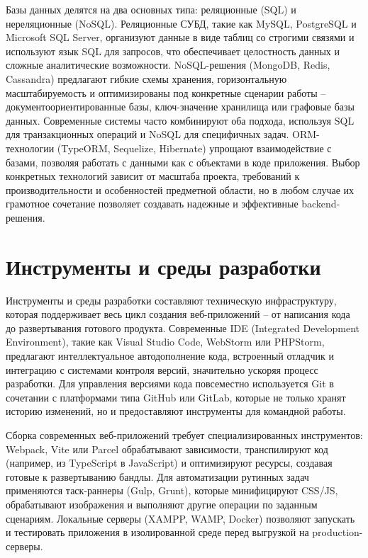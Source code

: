 \documentclass[referat]{SCWorks}
\begin{document}
Базы данных делятся на два основных типа: реляционные (SQL) и нереляционные (NoSQL). Реляционные СУБД, такие как MySQL, PostgreSQL и Microsoft SQL Server, организуют данные в виде таблиц со строгими связями и используют язык SQL для запросов, что обеспечивает целостность данных и сложные аналитические возможности. NoSQL-решения (MongoDB, Redis, Cassandra) предлагают гибкие схемы хранения, горизонтальную масштабируемость и оптимизированы под конкретные сценарии работы -- документоориентированные базы, ключ-значение хранилища или графовые базы данных. Современные системы часто комбинируют оба подхода, используя SQL для транзакционных операций и NoSQL для специфичных задач. ORM-технологии (TypeORM, Sequelize, Hibernate) упрощают взаимодействие с базами, позволяя работать с данными как с объектами в коде приложения. Выбор конкретных технологий зависит от масштаба проекта, требований к производительности и особенностей предметной области, но в любом случае их грамотное сочетание позволяет создавать надежные и эффективные backend-решения.\cite{backend_web_development}

\section{Инструменты и среды разработки}

Инструменты и среды разработки составляют техническую инфраструктуру, которая поддерживает весь цикл создания веб-приложений -- от написания кода до развертывания готового продукта. Современные IDE (Integrated Development Environment), такие как Visual Studio Code, WebStorm или PHPStorm, предлагают интеллектуальное автодополнение кода, встроенный отладчик и интеграцию с системами контроля версий, значительно ускоряя процесс разработки. Для управления версиями кода повсеместно используется Git в сочетании с платформами типа GitHub или GitLab, которые не только хранят историю изменений, но и предоставляют инструменты для командной работы.

Сборка современных веб-приложений требует специализированных инструментов: Webpack, Vite или Parcel обрабатывают зависимости, транспилируют код (например, из TypeScript в JavaScript) и оптимизируют ресурсы, создавая готовые к развертыванию бандлы. Для автоматизации рутинных задач применяются таск-раннеры (Gulp, Grunt), которые минифицируют CSS/JS, обрабатывают изображения и выполняют другие операции по заданным сценариям. Локальные серверы (XAMPP, WAMP, Docker) позволяют запускать и тестировать приложения в изолированной среде перед выгрузкой на production-серверы. 
\end{document}
